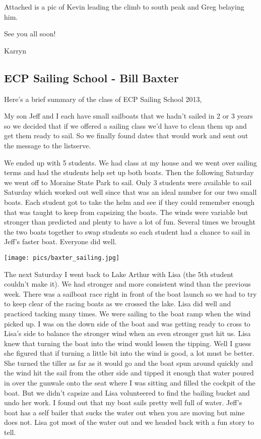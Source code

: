 \documentclass[10pt,a4paper]{article}
\newcommand\subsect[1]{%
  \subsection*{#1}%
  \addcontentsline{toc}{subsection}{#1}}
\newenvironment{Figure}
  {\par\medskip\noindent\minipage{\linewidth}}
  {\endminipage\par\medskip}
\begin{document}
\begin{multicols}{2}
Attached is a pic of Kevin leading the climb to south peak and Greg belaying him.  

See you all soon!     

Karryn

\subsect{ECP Sailing School - Bill Baxter}

Here's a brief summary of the class of ECP Sailing School 2013,

My son Jeff and I each have small sailboats that we hadn't sailed in 2 or 3 years so we decided that if we offered a sailing class we'd have to clean them up and get them ready to sail.   So we finally found dates that would work and sent out the message to the listserve.

We ended up with 5 students.  We had class at my house and we went over sailing terms and had the students help set up both boats.  Then the following Saturday we went off to Moraine State Park to sail.   Only 3 students were available to sail Saturday which worked out well since that was an ideal number for our two small boats.   Each student got to take the helm and see if they could remember enough that was taught to keep from capsizing the boats.  The winds were variable but stronger than predicted and plenty to have a lot of fun.  Several times we brought the two boats together to swap students so each student had a chance to sail in Jeff's faster boat.  Everyone did well.

\begin{Figure}
 \centering
 \texttt{[image: pics/baxter\_sailing.jpg]}
\end{Figure}

The next Saturday I went back to Lake Arthur with Lisa (the 5th student couldn't make it).  We had stronger and more consistent wind than the previous week.  There was a sailboat race right in front of the boat launch so we had to try to keep clear of the racing boats as we crossed the lake.  Lisa did well and practiced tacking many times.  We were sailing to the boat ramp when the wind picked up.  I was on the down side of the boat and was getting ready to cross to Lisa's side to balance the stronger wind when an even stronger gust hit us.  Lisa knew that turning the boat into the wind would lessen the tipping.  Well I guess she figured that if turning a little bit into the wind is good, a lot must be better.  She turned the tiller as far as it would go and the boat spun around quickly and the wind hit the sail from the other side and tipped it enough that water poured in over the gunwale onto the seat where I was sitting and filled the cockpit of the boat.  But we didn't capsize and Lisa volunteered to find the bailing bucket and undo her work.  I found out that my boat sails pretty well full of water.  Jeff's boat has a self bailer that sucks the water out when you are moving but mine does not.   Lisa got most of the water out and we headed back with a fun story to tell.


\end{multicols}
\end{document}
